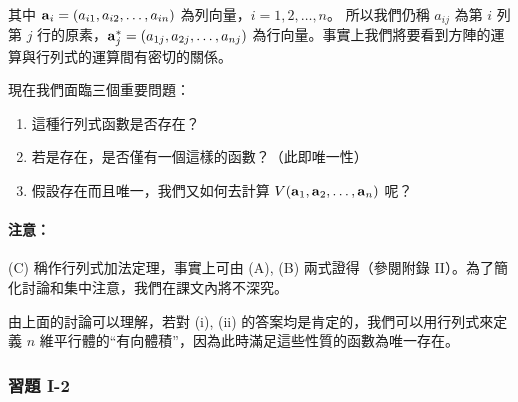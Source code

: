 其中 $\boldsymbol{\mathbf{a}}_i=(a_{i1}, a_{i2}, \dots, a_{in})$ 為列向量，$i=1, 2, \dots, n$。
所以我們仍稱 $a_{ij}$ 為第 $i$ 列第 $j$ 行的原素，$\boldsymbol{\mathbf{a}}_j^*=(a_{1j}, a_{2j}, \dots, a_{nj})$ 為行向量。事實上我們將要看到方陣的運算與行列式的運算間有密切的關係。

現在我們面臨三個重要問題：
\begin{enumerate}[label=(\roman*), leftmargin=2em]
  \item 這種行列式函數是否存在？
  \item 若是存在，是否僅有一個這樣的函數？（此即唯一性）
  \item 假設存在而且唯一，我們又如何去計算 $V(\boldsymbol{\mathbf{a}}_1, \boldsymbol{\mathbf{a}}_2, \dots, \boldsymbol{\mathbf{a}}_n)$ 呢？
\end{enumerate}

\paragraph{注意：}(C) 稱作行列式加法定理，事實上可由 (A), (B) 兩式證得（參閱附錄 II）。為了簡化討論和集中注意，我們在課文內將不深究。

由上面的討論可以理解，若對 (i), (ii) 的答案均是肯定的，我們可以用行列式來定義 $n$ 維平行體的“有向體積”，因為此時滿足這些性質的函數為唯一存在。

\subsubsection*{習題 I-2}\label{sec:b6-ex1-2}


